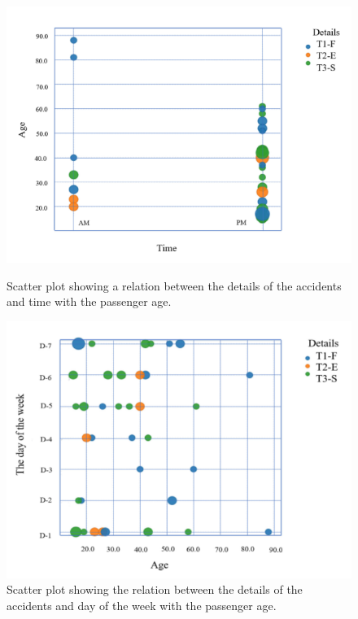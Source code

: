 \begin{figure}
    \begin{minipage}[c]{0.4\linewidth}
        \centering
        \includegraphics[scale=0.25]{chapters/images/scatter_1.png}
        \caption{Scatter plot showing a relation between the details of the accidents and time with the passenger age.}
        \label{fig:scatter_1}
    \end{minipage}
    \hfill
    \begin{minipage}[c]{0.40\linewidth}
        \centering
        \includegraphics[scale=0.25]{chapters/images/scatter_2.png}
        \caption{Scatter plot showing the relation between the details of the accidents and day of the week with the passenger age.}
        \label{fig:scatter_2}
    \end{minipage}
\end{figure}


